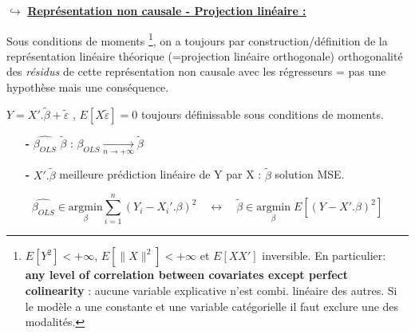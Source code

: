 \noindent $\hookrightarrow$ \underline{\textbf{Représentation non causale - Projection linéaire :}}\par
Sous conditions de moments \footnote{$E[Y^{2}]<+\infty$, $E[\lVert X \rVert^{2}]<+\infty$ et $E[XX']$ inversible. En particulier: \textbf{any level of correlation between covariates except perfect colinearity} : aucune variable explicative n'est combi. linéaire des autres. Si le modèle a une constante et une variable catégorielle il faut exclure une des modalités.}, on a toujours par construction/définition de la représentation linéaire théorique (=projection linéaire orthogonale) orthogonalité des \textit{résidus} de cette représentation non causale avec les régresseurs = pas une hypothèse mais une conséquence.\par
\begin{boxH}
    $Y = X'.\widetilde{\beta} + \widetilde{\varepsilon}$ , $E[X\widetilde{\varepsilon}]=0$ toujours définissable sous conditions de moments.\par
    \begin{itemize}
        \item[\textbf{-}] $\widehat{\beta_{OLS}}$  $\widetilde{\beta}$ : $\widehat{\beta_{OLS}} \underset{n \to +\infty}{\longrightarrow} \widetilde{\beta}$\par
        \item[\textbf{-}] $X'.\widetilde{\beta}$ meilleure prédiction linéaire de Y par X : $\widetilde{\beta}$ solution MSE.
    \end{itemize}
\end{boxH}

\begin{equation*} 
    \widehat{\beta_{OLS}} \in \underset{\beta}{\mathrm{argmin}} \sum_{i = 1}^{n}{(Y_{i} - X_{i}'.\beta)^{2}} \quad \longleftrightarrow \quad \widetilde{\beta} \in \underset{\beta}{\mathrm{argmin}} \; E[(Y-X'.\beta)^{2}]
\end{equation*}


